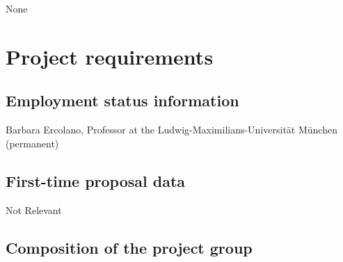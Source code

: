 \documentclass[10pt,fleqn,twoside]{article}
\begin{document}
None 

% 
% 
% 
% 
% 
% 
% 

\section{Project requirements}
\renewcommand{\leftmark}{\sc Project requirements}

\subsection{Employment status information}

Barbara Ercolano, Professor at the Ludwig-Maximilians-Universit\"at
M\"unchen  (permanent)

\subsection{First-time proposal data}

Not Relevant

\subsection{Composition of the project group}
\end{document}

